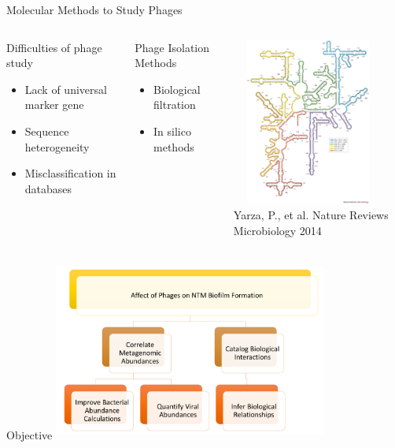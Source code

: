 \documentclass[11pt]{beamer}
\begin{document}
	
	\begin{frame}{Molecular Methods to Study Phages}
	\begin{columns}
	\begin{block}{Difficulties of phage study}
	\begin{itemize}
		\item Lack of universal marker gene
		\item Sequence heterogeneity 
		\item Misclassification in databases
	\end{itemize}
	\end{block}
		
		
	\begin{block}{Phage Isolation Methods}
	\begin{itemize}
		\item Biological filtration
		\item In silico methods
	\end{itemize}
	\end{block}
	
	\includegraphics[height=5.5cm, width=5cm]{ribosome.jpg} \\
	\tiny{Yarza, P., et al. Nature Reviews Microbiology 2014}
	\end{columns}
		
	
	\end{frame}

	
	\begin{frame}{Objective}
	\center
	\includegraphics[height=6cm, width=9cm]{objective.png}
	
	\end{frame}
\end{document}

